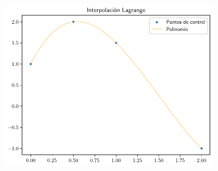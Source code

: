 
\begin{frame}
	\begin{solution}
		\begin{figure}[ht!]
			\centering
			\includegraphics[width=.72\paperwidth]{p7}
		\end{figure}
	\end{solution}
\end{frame}